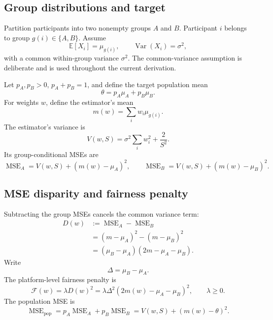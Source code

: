 \documentclass[11pt,a4paper]{article}
\newcommand{\E}{\mathbb{E}}
\newcommand{\1}{\mathbf{1}}
\newcommand{\MSE}{\operatorname{MSE}}
\begin{document}
\subsection{Group distributions and target}

Partition participants into two nonempty groups \(A\) and \(B\). Participant
\(i\) belongs to group \(g(i)\in\{A,B\}\). Assume
\begin{equation}
  \E[X_i]=\mu_{g(i)},\qquad
  \operatorname{Var}(X_i)=\sigma^2,
  \label{eq:group-moments}
\end{equation}
with a common within-group variance \(\sigma^2\). The common-variance
assumption is deliberate and is used throughout the current derivation.

Let \(p_A,p_B>0\), \(p_A+p_B=1\), and define the target population mean
\begin{equation}
  \theta=p_A\mu_A+p_B\mu_B.
  \label{eq:population-mean}
\end{equation}
For weights \(w\), define the estimator's mean
\begin{equation}
  m(w)=\sum_i w_i\mu_{g(i)}.
\end{equation}
The estimator's variance is
\begin{equation}
  V(w,S)=\sigma^2\sum_iw_i^2+\frac{2}{S^2}.
\end{equation}
Its group-conditional MSEs are
\begin{equation}
  \MSE_A=V(w,S)+(m(w)-\mu_A)^2,
  \qquad
  \MSE_B=V(w,S)+(m(w)-\mu_B)^2.
  \label{eq:group-MSE}
\end{equation}

\subsection{MSE disparity and fairness penalty}

Subtracting the group MSEs cancels the common variance term:
\begin{align}
  D(w)
  &:=\MSE_A-\MSE_B\\
  &=(m-\mu_A)^2-(m-\mu_B)^2\\
  &=(\mu_B-\mu_A)(2m-\mu_A-\mu_B).
  \label{eq:disparity}
\end{align}
Write
\begin{equation}
  \Delta=\mu_B-\mu_A.
\end{equation}
The platform-level fairness penalty is
\begin{equation}
  \mathcal F(w)=\lambda D(w)^2
  =\lambda\Delta^2(2m(w)-\mu_A-\mu_B)^2,
  \qquad \lambda\geq0.
  \label{eq:fairness}
\end{equation}
The population MSE is
\begin{equation}
  \MSE_{\mathrm{pop}}
  =p_A\MSE_A+p_B\MSE_B
  =V(w,S)+(m(w)-\theta)^2.
  \label{eq:pop-MSE}
\end{equation}
\end{document}
